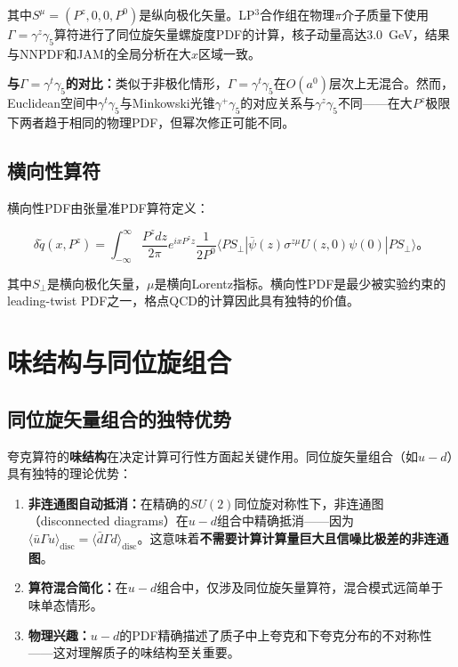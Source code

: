 \documentclass[12pt,a4paper]{ctexart}
\theoremstyle{definition}
\begin{document}
其中$S^\mu = (P^z, 0, 0, P^0)$是纵向极化矢量。LP$^3$合作组\cite{LP3helicity}在物理$\pi$介子质量下使用$\Gamma = \gamma^z\gamma_5$算符进行了同位旋矢量螺旋度PDF的计算，核子动量高达3.0~GeV，结果与NNPDF和JAM的全局分析在大$x$区域一致。

\textbf{与$\Gamma = \gamma^t\gamma_5$的对比：}类似于非极化情形，$\Gamma = \gamma^t\gamma_5$在$O(a^0)$层次上无混合\cite{Liu2019isovector}。然而，Euclidean空间中$\gamma^t\gamma_5$与Minkowski光锥$\gamma^+\gamma_5$的对应关系与$\gamma^z\gamma_5$不同——在大$P^z$极限下两者趋于相同的物理PDF，但幂次修正可能不同。

\subsection{横向性算符}

横向性PDF由张量准PDF算符定义\cite{Alexandrou2017}：

\begin{equation}
\delta \tilde{q}(x, P^z) = \int_{-\infty}^{\infty} \frac{P^z dz}{2\pi} e^{ixP^z z} \frac{1}{2P^0} \langle PS_\perp| \bar{\psi}(z) \sigma^{z\mu} U(z,0) \psi(0) |PS_\perp\rangle。
\label{eq:transversity_quasi}
\end{equation}

其中$S_\perp$是横向极化矢量，$\mu$是横向Lorentz指标。横向性PDF是最少被实验约束的leading-twist PDF之一，格点QCD的计算因此具有独特的价值\cite{Chu2024transversity}。

\section{味结构与同位旋组合}

\subsection{同位旋矢量组合的独特优势}

夸克算符的\textbf{味结构}在决定计算可行性方面起关键作用。同位旋矢量组合（如$u-d$）具有独特的理论优势\cite{LP3helicity,Liu2019isovector}：

\begin{enumerate}
    \item \textbf{非连通图自动抵消：}在精确的$SU(2)$同位旋对称性下，非连通图（disconnected diagrams）在$u-d$组合中精确抵消——因为$\langle \bar{u}\Gamma u \rangle_{\text{disc}} = \langle \bar{d}\Gamma d \rangle_{\text{disc}}$。这意味着\textbf{不需要计算计算量巨大且信噪比极差的非连通图}。

    \item \textbf{算符混合简化：}在$u-d$组合中，仅涉及同位旋矢量算符，混合模式远简单于味单态情形。

    \item \textbf{物理兴趣：}$u-d$的PDF精确描述了质子中上夸克和下夸克分布的不对称性——这对理解质子的味结构至关重要。
\end{enumerate}
\end{document}
